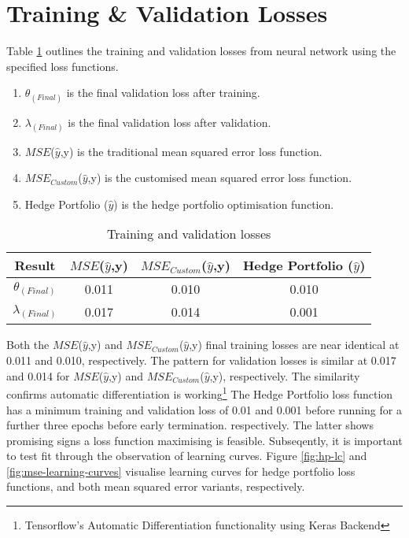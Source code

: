 \documentclass[12pt]{article}
\begin{document}
\section{Training \& Validation Losses}
Table \ref{train-val-losses} outlines the training and validation losses from neural network using the specified loss functions.
\begin{table}[H]
	\small
	\singlespacing
	\begin{enumerate}
	\item $\theta_{(Final)}$ is the final validation loss after training. 
    \item $\lambda_{(Final)}$ is the final validation loss after validation.
	\item $MSE$($\hat{y}$,y) is the traditional mean squared error loss function.
    \item $MSE_{Custom}$($\hat{y}$,y) is the customised mean squared error loss function.
	\item Hedge Portfolio ($\hat{y}$) is the hedge portfolio optimisation function.
	\end{enumerate}
	\doublespacing
	\centering
    \begin{tabular}{||c||c||c||c||}
        \hline
        Result & $MSE$($\hat{y}$,y) & $MSE_{Custom}$($\hat{y}$,y) & Hedge Portfolio ($\hat{y}$)\\ [0.5ex]
        \hline \hline
        $\theta_{(Final)}$ &0.011 & 0.010 & 0.010\\
        \hline
        $\lambda_{(Final)}$ & 0.017 & 0.014& 0.001\\
		\hline
    \end{tabular}
    \caption{Training and validation losses}
    \label{train-val-losses}
\end{table}
Both the $MSE$($\hat{y}$,y) and $MSE_{Custom}$($\hat{y}$,y) final training losses are near identical at 0.011 and 0.010, respectively.
The pattern for validation losses is similar at 0.017 and 0.014 for $MSE$($\hat{y}$,y) and $MSE_{Custom}$($\hat{y}$,y), respectively.
The similarity confirms automatic differentiation is working\footnote{Tensorflow's Automatic Differentiation functionality using Keras Backend}
The Hedge Portfolio loss function has a minimum training and validation loss of 0.01 and 0.001 before running for a further three epochs before early termination. respectively.
The latter shows promising signs a loss function maximising is feasible. 
Subseqently, it is important to test fit through the observation of learning curves.
Figure \ref{fig:hp-lc} and \ref{fig:mse-learning-curves} visualise learning curves for hedge portfolio loss functions, and both mean squared error variants, respectively.
\end{document}
